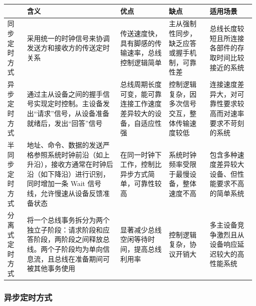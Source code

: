 \documentclass[./computer-organization-and-architecture.tex]{subfiles}
\begin{document}
    \begin{table}[htbp]
        \centering
        \renewcommand{\arraystretch}{1.5}   %
        \setlength{\tabcolsep}{6pt}         %
        \small
        \begin{tabular}{|
                >{\centering\arraybackslash}m{2cm}|
                >{\centering\arraybackslash}m{6cm}|
                >{\centering\arraybackslash}m{3cm}|
                >{\centering\arraybackslash}m{3cm}|
                >{\centering\arraybackslash}m{3cm}|}
            \hline
            & \textbf{含义}                                                                    & \textbf{优点}                     & \textbf{缺点}             & \textbf{适用场景}                \\
            \hline
            同步定时方式  & 采用统一的时钟信号来协调发送方和接收方的传送定时关系                                                     & 传送速度快，具有脚感的传输速率，总线控制逻辑简单        & 主从强制性同步，缺乏应答或握手机制，可靠性差 & 总线长度较短且所连接各部件的存取时间比较接近的系统                            \\
            \hline
            异步定时方式  & 通过主从设备之间的握手信号实现定时控制。主设备发出“请求”信号，从设备准备就绪后，发出“回答”信号                              & 总线周期长度可变，能可靠连接工作速度差异较大的设备，自适应性强 & 控制逻辑复杂，因多次信号交互，整体传输速度较低 & 连接速度差异大，对可靠性要求较高而对速率要求不苛刻的系统 \\
            \hline
            半同步定时方式 & 地址、命令、数据的发送严格参照系统时钟前沿（如上升沿），接收方通常在时钟后沿（如下降沿）进行识别，同时增加一条 Wait 信号线，允许慢速从设备反馈准备状态 & 在同一时钟下工作，控制比异步方式简单，可靠性较高 & 系统时钟频率受限于最慢设备，整体速度不高 & 包含多种速度差异较大设备、但性能要求不高的简单系统 \\
            \hline
            分离式定时方式 & 将一个总线事务拆分为两个独立子阶段：请求阶段和应答阶段，两阶段之间释放总线。两个子阶段均为单向信息流，且总线在准备期间可被其他事务使用            & 显著减少总线空闲等待时间，提高总线利用率 & 控制逻辑复杂，协议开销大 & 多主设备竞争激烈且从设备响应延迟较大的高性能系统  \\
            \hline
        \end{tabular}
    \end{table}

    \subsubsection{异步定时方式}
\end{document}
